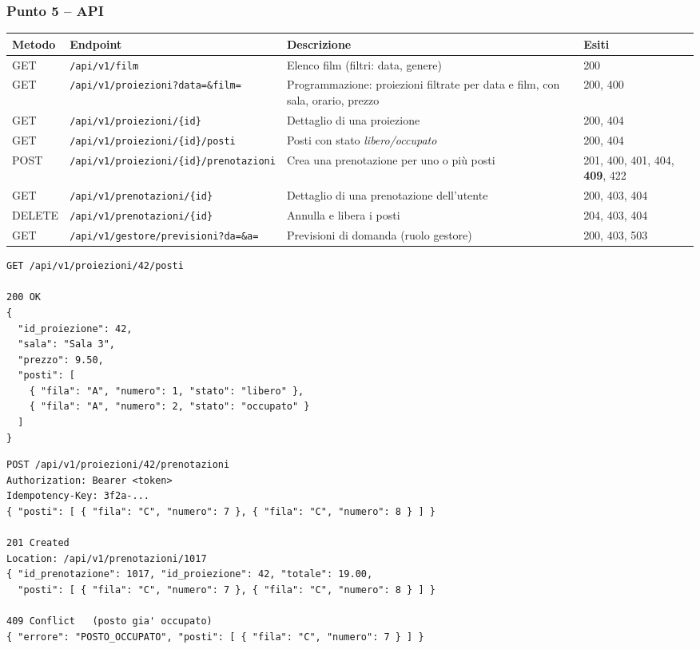 \subsubsection*{Punto 5 -- API}
\begin{center}
\small
\begin{tabularx}{\textwidth}{@{}>{\raggedright\arraybackslash}p{1.3cm}>{\raggedright\arraybackslash}p{4.6cm}Xl@{}}
\toprule
\textbf{Metodo} & \textbf{Endpoint} & \textbf{Descrizione} & \textbf{Esiti} \\
\midrule
GET & \texttt{/api/v1/film} & Elenco film (filtri: data, genere) & 200 \\
GET & \texttt{/api/v1/proiezioni?data=\&film=} & Programmazione: proiezioni filtrate per data e film, con sala, orario, prezzo & 200, 400 \\
GET & \texttt{/api/v1/proiezioni/\{id\}} & Dettaglio di una proiezione & 200, 404 \\
GET & \texttt{/api/v1/proiezioni/\{id\}/posti} & Posti con stato \emph{libero/occupato} & 200, 404 \\
POST & \texttt{/api/v1/proiezioni/\{id\}/prenotazioni} & Crea una prenotazione per uno o più posti & 201, 400, 401, 404, \textbf{409}, 422 \\
GET & \texttt{/api/v1/prenotazioni/\{id\}} & Dettaglio di una prenotazione dell'utente & 200, 403, 404 \\
DELETE & \texttt{/api/v1/prenotazioni/\{id\}} & Annulla e libera i posti & 204, 403, 404 \\
GET & \texttt{/api/v1/gestore/previsioni?da=\&a=} & Previsioni di domanda (ruolo gestore) & 200, 403, 503 \\
\bottomrule
\end{tabularx}
\end{center}

\begin{lstlisting}[numbers=none, caption={Esempio: elenco dei posti di una proiezione}]
GET /api/v1/proiezioni/42/posti

200 OK
{
  "id_proiezione": 42,
  "sala": "Sala 3",
  "prezzo": 9.50,
  "posti": [
    { "fila": "A", "numero": 1, "stato": "libero" },
    { "fila": "A", "numero": 2, "stato": "occupato" }
  ]
}
\end{lstlisting}

\begin{lstlisting}[numbers=none, caption={Esempio: creazione di una prenotazione}]
POST /api/v1/proiezioni/42/prenotazioni
Authorization: Bearer <token>
Idempotency-Key: 3f2a-...
{ "posti": [ { "fila": "C", "numero": 7 }, { "fila": "C", "numero": 8 } ] }

201 Created
Location: /api/v1/prenotazioni/1017
{ "id_prenotazione": 1017, "id_proiezione": 42, "totale": 19.00,
  "posti": [ { "fila": "C", "numero": 7 }, { "fila": "C", "numero": 8 } ] }

409 Conflict   (posto gia' occupato)
{ "errore": "POSTO_OCCUPATO", "posti": [ { "fila": "C", "numero": 7 } ] }
\end{lstlisting}

